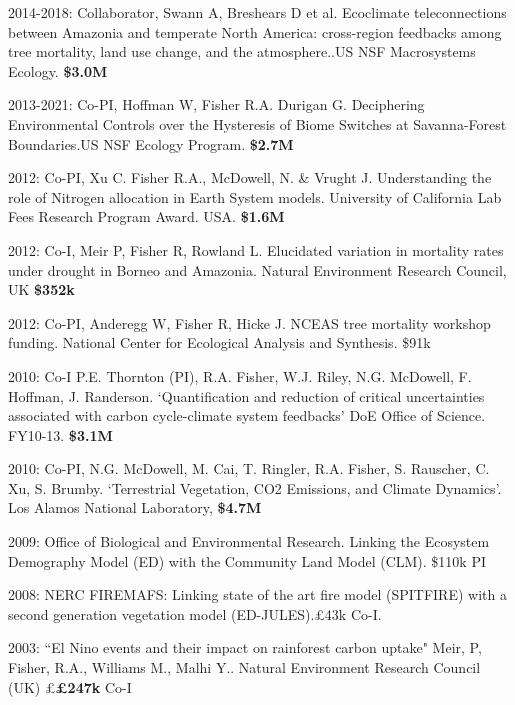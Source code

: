 \documentclass[10pt]{article}
\newenvironment{lonelist}[1][\enskip\textbullet]%
        {\vspace{-\baselineskip}\begin{list}{#1}{%
        \setlength{\itemindent}{-3pt} 
        \setlength{\partopsep}{0pt}%
        \setlength{\leftmargin}{10pt}
        \setlength{\topsep}{15pt}}}
        {\end{list}\vspace{-.3\baselineskip}}
\begin{document}
\begin{lonelist}
 \item 2014-2018: Collaborator, Swann A, Breshears D et al. Ecoclimate teleconnections between Amazonia and temperate North America:  cross-region feedbacks among tree mortality, land use change, and the atmosphere..US NSF Macrosystems Ecology. \textbf{\$3.0M}
 
 \item 2013-2021: Co-PI, Hoffman W, Fisher R.A. Durigan G. Deciphering Environmental Controls over the Hysteresis of Biome Switches at Savanna-Forest Boundaries.US NSF Ecology Program. \textbf{\$2.7M}
 
 \item 2012: Co-PI, Xu C. Fisher R.A., McDowell, N. \& Vrught J. Understanding the role of Nitrogen allocation in Earth System models.  University of California Lab Fees Research Program Award. USA.  \textbf{\$1.6M}
 
  \item 2012: Co-I, Meir P, Fisher R, Rowland L.  Elucidated variation in mortality rates under drought in Borneo and Amazonia. Natural Environment Research Council, UK \textbf{\$352k }
  
  \item2012: Co-PI, Anderegg W, Fisher R, Hicke J. NCEAS tree mortality workshop funding. National Center for Ecological Analysis and Synthesis. \$91k
  
   \item 2010: Co-I P.E. Thornton (PI), R.A. Fisher, W.J. Riley, N.G. McDowell, F. Hoffman, J. Randerson. `Quantification and reduction of critical uncertainties associated with carbon cycle-climate system feedbacks'   DoE Office of Science. FY10-13. \textbf{\$3.1M}
   
   \item 2010: Co-PI, N.G. McDowell, M. Cai, T. Ringler, R.A. Fisher, S. Rauscher, C. Xu, S. Brumby. `Terrestrial Vegetation, CO2 Emissions, and Climate Dynamics'.  Los Alamos National Laboratory, \textbf{\$4.7M} 
   
   \item 2009: Office of Biological and Environmental Research.  Linking the Ecosystem Demography Model (ED) with the Community Land Model (CLM). \$110k PI
   
   \item 2008: NERC FIREMAFS: Linking state of the art fire model (SPITFIRE) with a second generation vegetation model (ED-JULES).\pounds43k Co-I. 
   
   \item 2003: “El Nino events and their impact on rainforest carbon uptake"  Meir, P, Fisher, R.A., Williams M., Malhi Y.. Natural Environment Research Council (UK)  \pounds \textbf{\pounds247k} Co-I 
   

\end{lonelist}
\end{document}
